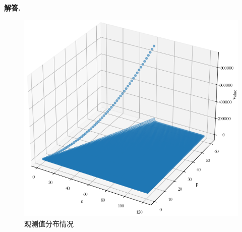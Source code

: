 \documentclass[12pt, a4paper, oneside]{ctexart}
\newenvironment{solution}{\par\noindent\textbf{解答. }}{\par}
\begin{document}
\begin{solution}
    \begin{figure}[h]
        \centering
        \includegraphics[width=\textwidth]{Assignment3-Figure_1.png}
        \caption{观测值分布情况}
    \end{figure}
\end{solution}
\end{document}
